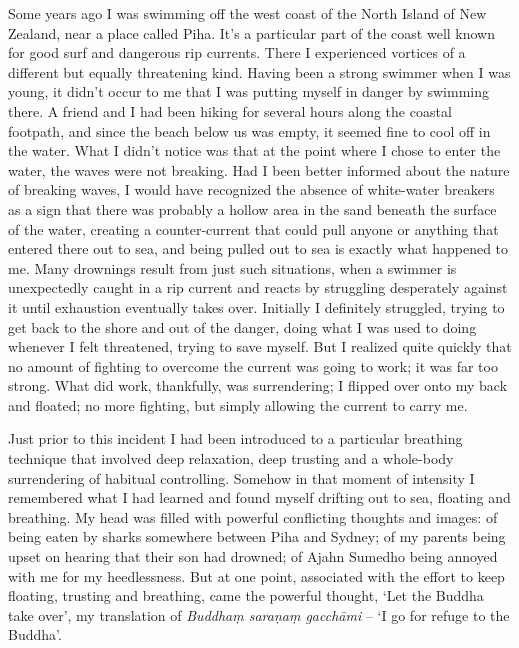 Some years ago I was swimming off the west coast of the North Island of
New Zealand, near a place called Piha. It’s a particular part of the
coast well known for good surf and dangerous rip currents. There I
experienced vortices of a different but equally threatening kind. Having
been a strong swimmer when I was young, it didn’t occur to me that I was
putting myself in danger by swimming there. A friend and I had been
hiking for several hours along the coastal footpath, and since the beach
below us was empty, it seemed fine to cool off in the water. What I
didn’t notice was that at the point where I chose to enter the water,
the waves were not breaking. Had I been better informed about the nature
of breaking waves, I would have recognized the absence of white-water
breakers as a sign that there was probably a hollow area in the sand
beneath the surface of the water, creating a counter-current that could
pull anyone or anything that entered there out to sea, and being pulled
out to sea is exactly what happened to me. Many drownings result from
just such situations, when a swimmer is unexpectedly caught in a rip
current and reacts by struggling desperately against it until exhaustion
eventually takes over. Initially I definitely struggled, trying to get
back to the shore and out of the danger, doing what I was used to doing
whenever I felt threatened, trying to save myself. But I realized quite
quickly that no amount of fighting to overcome the current was going to
work; it was far too strong. What did work, thankfully, was
surrendering; I flipped over onto my back and floated; no more fighting,
but simply allowing the current to carry me.

Just prior to this incident I had been introduced to a particular
breathing technique that involved deep relaxation, deep trusting and a
whole-body surrendering of habitual controlling. Somehow in that moment
of intensity I remembered what I had learned and found myself drifting
out to sea, floating and breathing. My head was filled with powerful
conflicting thoughts and images: of being eaten by sharks somewhere
between Piha and Sydney; of my parents being upset on hearing that their
son had drowned; of Ajahn Sumedho being annoyed with me for my
heedlessness. But at one point, associated with the effort to keep
floating, trusting and breathing, came the powerful thought, ‘Let the
Buddha take over’, my translation of \emph{Buddhaṃ saraṇaṃ gacchāmi} – ‘I go
for refuge to the Buddha’.

